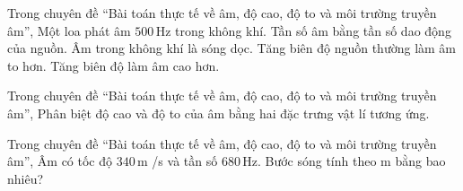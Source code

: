 

\begin{ex}
Trong chuyên đề “Bài toán thực tế về âm, độ cao, độ to và môi trường truyền âm”, Một loa phát âm $500\,\text{Hz}$ trong không khí.
\choiceTF
{\True Tần số âm bằng tần số dao động của nguồn.}
{\True Âm trong không khí là sóng dọc.}
{\True Tăng biên độ nguồn thường làm âm to hơn.}
{Tăng biên độ làm âm cao hơn.}
\end{ex}

\begin{ex}
Trong chuyên đề “Bài toán thực tế về âm, độ cao, độ to và môi trường truyền âm”, Phân biệt độ cao và độ to của âm bằng hai đặc trưng vật lí tương ứng.
\choiceTF

\end{ex}

\begin{ex}
Trong chuyên đề “Bài toán thực tế về âm, độ cao, độ to và môi trường truyền âm”, Âm có tốc độ $340\,\text{m}$ /s và tần số $680\,\text{Hz}$. Bước sóng tính theo m bằng bao nhiêu?
\end{ex}

